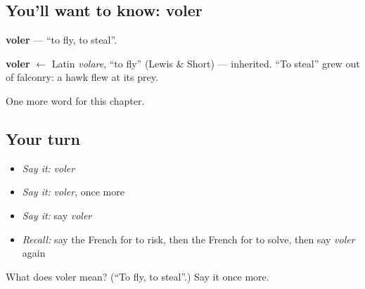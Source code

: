 \subsection*{You'll want to know: voler}
\textbf{voler} — \textquotedblleft{}to fly, to steal\textquotedblright{}.

\begin{cousinweb}
\textbf{voler} $\leftarrow$ Latin \emph{volare}, \textquotedblleft{}to fly\textquotedblright{} (Lewis \& Short) — inherited. \textquotedblleft{}To steal\textquotedblright{} grew out of falconry: a hawk flew at its prey.
\end{cousinweb}

\begin{grammarlens}[title={What you've built}]
One more word for this chapter.
\end{grammarlens}

\subsection*{Your turn}
\begin{itemize}
\raggedright
  \item \emph{Say it:} \emph{voler}
  \item \emph{Say it:} \emph{voler}, once more
  \item \emph{Say it:} say \emph{voler}
  \item \emph{Recall:} say the French for to risk, then the French for to solve, then say \emph{voler} again
\end{itemize}

\begin{tcolorbox}[breakable,colback=teal!4,colframe=teal!35!black,title={Before you move on}]
What does voler mean? (\textquotedblleft{}To fly, to steal\textquotedblright{}.) Say it once more.
\end{tcolorbox}
